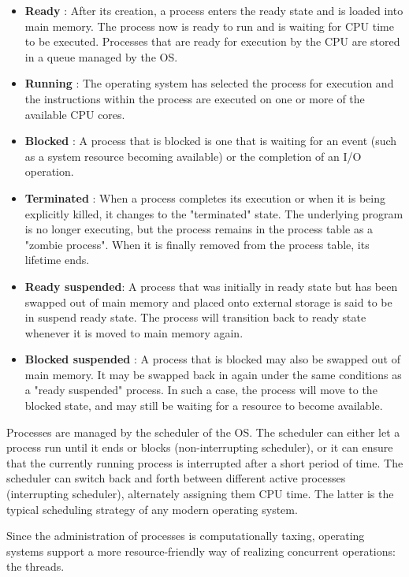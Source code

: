 \documentclass[11pt, a4paper]{article}
\begin{document}
\begin{itemize}
	\item \textbf{Ready} : After its creation, a process enters the ready state and is loaded into main memory. The process now is ready to run and is waiting for CPU time to be executed. Processes that are ready for execution by the CPU are stored in a queue managed by the OS.
	\item \textbf{Running} : The operating system has selected the process for execution and the instructions within the process are executed on one or more of the available CPU cores.
	\item \textbf{Blocked} : A process that is blocked is one that is waiting for an event (such as a system resource becoming available) or the completion of an I/O operation.
	\item \textbf{Terminated} : When a process completes its execution or when it is being explicitly killed, it changes to the "terminated" state. The underlying program is no longer executing, but the process remains in the process table as a "zombie process". When it is finally removed from the process table, its lifetime ends.
	\item \textbf{Ready suspended}: A process that was initially in ready state but has been swapped out of main memory and placed onto external storage is said to be in suspend ready state. The process will transition back to ready state whenever it is moved to main memory again.
	\item \textbf{Blocked suspended} : A process that is blocked may also be swapped out of main memory. It may be swapped back in again under the same conditions as a "ready suspended" process. In such a case, the process will move to the blocked state, and may still be waiting for a resource to become available.
\end{itemize}





Processes are managed by the scheduler of the OS. The scheduler can either let a process run until it ends or blocks (non-interrupting scheduler), or it can ensure that the currently running process is interrupted after a short period of time. The scheduler can switch back and forth between different active processes (interrupting scheduler), alternately assigning them CPU time. The latter is the typical scheduling strategy of any modern operating system.

Since the administration of processes is computationally taxing, operating systems support a more resource-friendly way of realizing concurrent operations: the threads.
\end{document}
